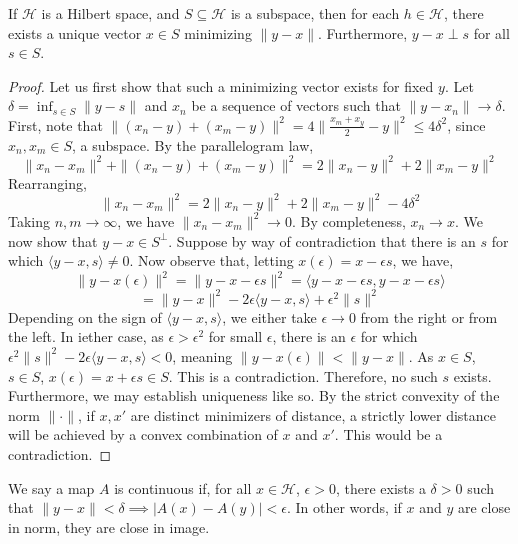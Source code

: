     \begin{theorem}
        If $\mathcal H$ is a Hilbert space, and $S \subseteq \mathcal H$ is a subspace, then 
        for each $h \in \mathcal H$, there exists a unique vector $x \in S$ minimizing 
        $\|y-x\|$. Furthermore, $y-x \perp s$ for all $s \in S$. 
    \end{theorem}
    \begin{proof}
        Let us first show that such a minimizing vector exists for fixed $y$. 
        Let $\delta = \inf_{s \in S}\|y-s\|$ and $x_n$ be a sequence of vectors such that 
        $\|y-x_n\| \to \delta$. First, note that $\|(x_n - y)+(x_m-y)\|^2 = 4\|\frac{x_m + x_y}{2} - y\|^2 \leq 4\delta^2$, since 
        $x_n, x_m \in S$, a subspace. By the parallelogram law, 
        \[ \|x_n - x_m\|^2 +  \|(x_n - y)+(x_m-y)\|^2 = 2\|x_n - y\|^2 + 2\|x_m - y\|^2 \]
        Rearranging, 
        \[  \|x_n - x_m\|^2 = 2\|x_n - y\|^2 + 2\|x_m - y\|^2 - 4 \delta^2 \]
        Taking $n,m \to \infty$, we have $\|x_n - x_m\|^2  \to 0$. By completeness, 
        $x_n \to x$. We now show that $y-x \in S^\perp$. Suppose by way of contradiction that 
        there is an $s$ for which $\langle y-x, s\rangle \neq 0$. Now observe that, letting 
        $x(\epsilon) = x - \epsilon s$, we have, 
        \[ \|y - x(\epsilon)\|^2 = \|y - x - \epsilon s\|^2 = \langle y-x-\epsilon s,y-x-\epsilon s\rangle  \]
        \[ = \|y-x\|^2 - 2\epsilon \langle y - x,  s\rangle + \epsilon^2 \|s\|^2 \]
        Depending on the sign of $\langle y - x,  s\rangle$, we either take $\epsilon \to 0$ from the right or from the left. 
        In iether case, as $\epsilon > \epsilon^2$ for small $\epsilon$, there is an $\epsilon$ for which 
        $\epsilon^2 \|s\|^2 - 2\epsilon \langle y - x,  s\rangle < 0$, meaning $\|y-x(\epsilon)\| < \|y-x\|$. 
        As $x \in S$, $s \in S$, $x(\epsilon) = x + \epsilon s \in S$. This is a contradiction. Therefore, no such 
        $s$ exists.\\
        Furthermore, we may establish uniqueness like so. By the strict convexity of the norm 
        $\|\cdot\|$, if $x,x'$ are distinct minimizers of distance, a strictly lower distance will be achieved by a convex 
        combination of $x$ and $x'$. This would be a contradiction.
    \end{proof}

    We say a map $A$ is continuous if, for all $x \in \mathcal H$, $\epsilon > 0$, there exists a 
    $\delta > 0$ such that $\|y-x\|<\delta \implies |A(x)-A(y)| < \epsilon$. In other words, if 
    $x$ and $y$ are close in norm, they are close in image.

